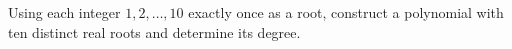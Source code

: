 Using each integer $1,2,\ldots,10$ exactly once as a root, construct a polynomial with ten distinct real roots and determine its degree.
